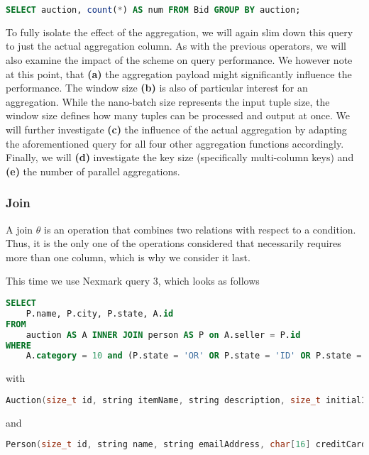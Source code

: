 \begin{lstlisting}[language=SQL]
SELECT auction, count(*) AS num FROM Bid GROUP BY auction;
\end{lstlisting}

To fully isolate the effect of the aggregation, we will again slim down this query to just the actual aggregation column.
As with the previous operators, we will also examine the impact of the scheme on query performance.
We however note at this point, that \textbf{(a)} the aggregation payload might significantly influence the performance.
The window size \textbf{(b)} is also of particular interest for an aggregation.
While the nano-batch size represents the input tuple size, the window size defines how many tuples can be processed and output at once. 
We will further investigate \textbf{(c)} the influence of the actual aggregation by adapting the aforementioned query for all four other aggregation functions accordingly. 
Finally, we will \textbf{(d)} investigate the key size (specifically multi-column keys) and \textbf{(e)} the number of parallel aggregations.

\subsubsection{Join}

A join $\theta$ is an operation that combines two relations with respect to a condition.
Thus, it is the only one of the operations considered that necessarily requires more than one column, which is why we consider it last.

This time we use Nexmark query 3, which looks as follows

\begin{lstlisting}[language=SQL]
SELECT
    P.name, P.city, P.state, A.id
FROM
    auction AS A INNER JOIN person AS P on A.seller = P.id
WHERE
    A.category = 10 and (P.state = 'OR' OR P.state = 'ID' OR P.state = 'CA');
\end{lstlisting}

with

\begin{lstlisting}[language=c++]
Auction(size_t id, string itemName, string description, size_t initialId, size_t reserve, time_t dateTime, time_t expires, size_t seller, size_t category, string extra);
\end{lstlisting}

and

\begin{lstlisting}[language=c++]
Person(size_t id, string name, string emailAddress, char[16] creditCard, string city, char[2] state, time_t dateTime, string extra);
\end{lstlisting}

